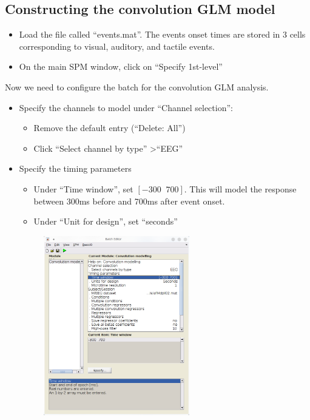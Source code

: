 	\subsection{Constructing the convolution GLM model}
		\begin{itemize}
			\item Load the file called ``events.mat''. The events onset times are stored in 3 cells corresponding to visual, auditory, and tactile events.
			\item On the main SPM window, click on ``Specify 1st-level''
		\end{itemize} 
		Now we need to configure the batch for the convolution GLM analysis. 
		\begin{itemize}
			\item Specify the channels to model under ``Channel selection'':
			\begin{itemize}
				\item Remove the default entry (``Delete: All'')
				\item Click ``Select channel by type'' \textgreater ``EEG''
			\end{itemize}
			\item Specify the timing parameters
			\begin{itemize}
				\item Under ``Time window'', set $[-300 \;\; 700]$. This will model the response between 300ms before and 700ms after event onset. 
				\item Under ``Unit for design'', set ``seconds''
			\end{itemize}
			\begin{figure}[htb]
			 	\centering
			 	\includegraphics[width=0.6\textwidth]{meeg_firstlevel/figures/conv-top.png}

\end{figure}
\end{itemize}
